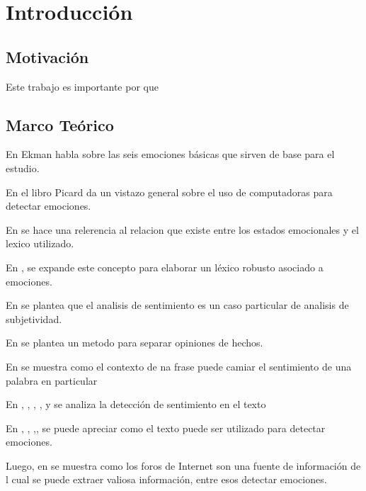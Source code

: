 \chapter{Introducción}






\section{Motivación}

Este trabajo es importante por que 



\section{Marco Teórico}

En \cite{ekman1993facial} Ekman habla sobre las seis emociones básicas que sirven de base para el estudio.

En el libro \cite{picard2000affective} Picard da un vistazo general sobre el uso de computadoras para detectar emociones.

En \cite{ortony1987referential} se hace una relerencia al relacion que existe entre los estados emocionales y el lexico utilizado.


En \cite{hatzivassiloglou1997predicting}, \cite{strapparava2004wordnet}  se expande este concepto para elaborar un léxico robusto asociado a emociones.

En \cite{wiebe1994tracking} se plantea que el analisis de sentimiento es un caso particular de analisis de subjetividad.


En \cite{yu2003towards} se plantea un metodo para separar opiniones de hechos.

En \cite{wilson2009recognizing} se muestra como el contexto de na frase puede camiar el sentimiento de una palabra en particular



En \cite{pang2002thumbs}, \cite{pang2004sentimental},  \cite{wilson2005recognizing}, \cite{turney2002thumbs}, \cite{kim2004determining} y  se analiza la detección de sentimiento en el texto

En \cite{wiebe2005annotating}\cite{strapparava2008learning}, \cite{strapparava2007semeval}, \cite{alm2005emotions},\cite{aman2007identifying}, \cite{liu2003model}  se puede apreciar como el texto puede ser utilizado para detectar emociones.

Luego, en \cite{pang2008opinion} se muestra como los foros de Internet son una fuente de información de l cual se puede extraer valiosa información, entre esos detectar emociones.


